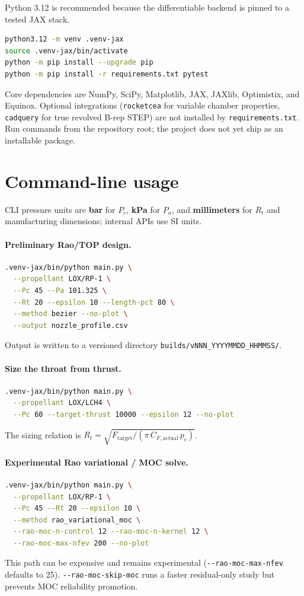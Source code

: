 \documentclass[11pt]{article}
\newcommand{\cmd}[1]{\nolinkurl{#1}}
\newcommand{\code}[1]{\texttt{#1}}
\begin{document}
Python 3.12 is recommended because the differentiable backend is pinned to a
tested JAX stack.
\begin{lstlisting}[language=bash]
python3.12 -m venv .venv-jax
source .venv-jax/bin/activate
python -m pip install --upgrade pip
python -m pip install -r requirements.txt pytest
\end{lstlisting}
Core dependencies are NumPy, SciPy, Matplotlib, JAX, JAXlib, Optimistix, and
Equinox. Optional integrations (\code{rocketcea} for variable chamber
properties, \code{cadquery} for true revolved B-rep STEP) are not installed by
\code{requirements.txt}. Run commands from the repository root; the project
does not yet ship as an installable package.

\section{Command-line usage}

CLI pressure units are \textbf{bar} for $P_c$, \textbf{kPa} for $P_a$, and
\textbf{millimeters} for $R_t$ and manufacturing dimensions; internal APIs use
SI units.

\paragraph{Preliminary Rao/TOP design.}
\begin{lstlisting}[language=bash]
.venv-jax/bin/python main.py \
  --propellant LOX/RP-1 \
  --Pc 45 --Pa 101.325 \
  --Rt 20 --epsilon 10 --length-pct 80 \
  --method bezier --no-plot \
  --output nozzle_profile.csv
\end{lstlisting}
Output is written to a versioned directory \code{builds/vNNN\_YYYYMMDD\_HHMMSS/}.

\paragraph{Size the throat from thrust.}
\begin{lstlisting}[language=bash]
.venv-jax/bin/python main.py \
  --propellant LOX/LCH4 \
  --Pc 60 --target-thrust 10000 --epsilon 12 --no-plot
\end{lstlisting}
The sizing relation is
$R_t=\sqrt{F_{\mathrm{target}}/(\pi\,C_{F,\mathrm{actual}}\,p_c)}$.

\paragraph{Experimental Rao variational / MOC solve.}
\begin{lstlisting}[language=bash]
.venv-jax/bin/python main.py \
  --propellant LOX/RP-1 \
  --Pc 45 --Rt 20 --epsilon 10 \
  --method rao_variational_moc \
  --rao-moc-n-control 12 --rao-moc-n-kernel 12 \
  --rao-moc-max-nfev 200 --no-plot
\end{lstlisting}
This path can be expensive and remains experimental
(\cmd{--rao-moc-max-nfev} defaults to 25). \cmd{--rao-moc-skip-moc} runs a
faster residual-only study but prevents MOC reliability promotion.
\end{document}
